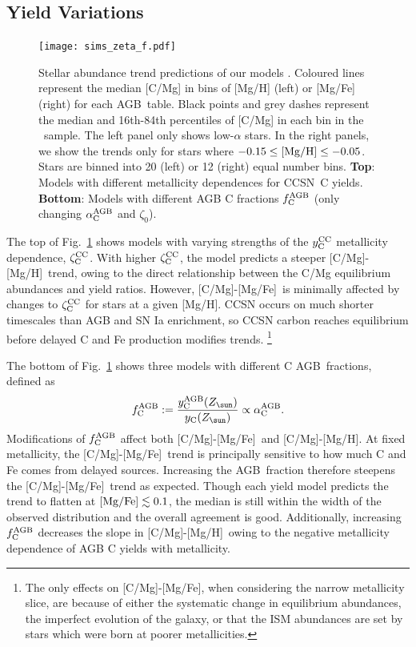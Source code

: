 \documentclass[fleqn,
referee, %
usenatbib]{mnras}
\newcommand{\agb}{AGB}
\newcommand{\cc}{CCSN}
\newcommand{\caah}{[C/Mg]-[Mg/H]}
\newcommand{\caafe}{[C/Mg]-[Mg/Fe]}
\newcommand{\Yct}{{y_{\rm C}}}
\newcommand{\Ycc}{{y_{\rm C}^{\rm CC}}}
\newcommand{\Ycagb}{{y_{\rm C}^{\rm AGB}}}
\newcommand{\aagb}{\alpha_{\rm C}^{\rm AGB}}
\newcommand{\zcc}{\zeta_{\rm C}^{\rm CC}}
\newcommand{\fagb}{f_{\rm C}^{\rm AGB}}
\newcommand{\zetao}{\zeta_0}
\newcommand{\Zo}{ Z_{\sun}}
\begin{document}
\subsection{Yield Variations}\label{sec:results_highmass}
\label{sec:agb_results}

\begin{figure}
    \texttt{[image: sims\_zeta\_f.pdf]}
    
    \caption[]{
        Stellar abundance trend predictions of our models . Coloured lines represent the median [C/Mg] in bins of [Mg/H] (left) or [Mg/Fe] (right) for each \agb\ table. Black points and grey dashes represent the median and 16th-84th percentiles of [C/Mg] in each bin in the \citet{jack}~sample. 
        The left panel only shows low-$\alpha$ stars. In the right panels, we show the trends only for stars where $-0.15\leq {\rm [Mg/H]}\leq -0.05$.
        Stars are binned into 20 (left) or 12 (right) equal number bins. 
        \textbf{Top}: Models with different metallicity dependences for  \cc\ C yields. \textbf{Bottom}: Models with different AGB C fractions $\fagb$ (only changing $\aagb$ and $\zetao$).
    }
    \label{fig:zeta_f}
\end{figure}




The top of Fig.~\ref{fig:zeta_f} shows models with varying strengths of the $\Ycc$ metallicity dependence, $\zcc$. With higher $\zcc$, the model predicts a steeper \caah\ trend, owing to the direct relationship between the C/Mg equilibrium abundances and yield ratios. 
However, \caafe~is minimally affected by changes to $\zcc$ for stars at a given [Mg/H].
CCSN occurs on much shorter timescales than AGB and SN Ia enrichment, so CCSN carbon reaches equilibrium before delayed C and Fe production modifies trends. 
\footnote{The only effects on \caafe, when considering the narrow metallicity slice, are because of either the systematic change in equilibrium abundances, the imperfect evolution of the galaxy, or that the ISM abundances are set by stars which were born at poorer metallicities. }


The bottom of Fig.~\ref{fig:zeta_f} shows three models with different C \agb\  fractions, defined as 
\begin{equation}\label{eq:f_agb}
    \fagb := \frac{\Ycagb(\Zo)}{\Yct(\Zo)} \propto \aagb.
\end{equation}
Modifications of $\fagb$ affect both \caafe\ and \caah. At fixed metallicity, the \caafe\ trend is principally sensitive to how much C and Fe comes from delayed sources. Increasing the \agb\ fraction therefore steepens the \caafe\ trend as expected. Though each yield model predicts the trend to flatten at ${\rm [Mg/Fe]} \lesssim 0.1 $, the median is still within the width of the observed distribution and the overall agreement is good. Additionally, increasing $\fagb$ decreases the slope in \caah\ owing to the negative metallicity dependence of AGB C yields with metallicity.
\end{document}
